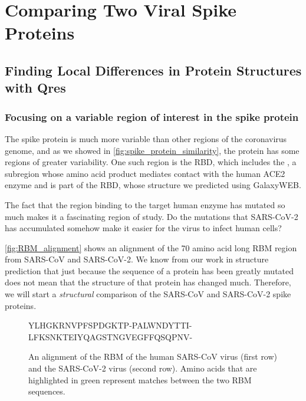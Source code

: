 \chapter[Comparing Two Viral Spike Proteins]{Comparing Two Viral Spike Proteins}
\label{chapter:coronavirus_2}
\renewcommand{\chaptertitle}{Comparing Two Viral Spike Proteins}

\FloatBarrier
{}

\section{Finding Local Differences in Protein Structures with Qres}
\label{sec:multiseq}

\FloatBarrier
{}
\subsection{Focusing on a variable region of interest in the spike protein}

The spike protein is much more variable than other regions of the coronavirus genome, and as we showed in \autoref{fig:spike_protein_similarity}, the protein has some regions of greater variability.  One such region is the RBD, which includes the , a subregion whose amino acid product mediates contact with the human ACE2 enzyme and is part of the RBD, whose structure we predicted using GalaxyWEB.

The fact that the region binding to the target human enzyme has mutated so much makes it a fascinating region of study. Do the mutations that SARS-CoV-2 has accumulated somehow make it easier for the virus to infect human cells?

\autoref{fig:RBM_alignment} shows an alignment of the 70 amino acid long RBM region from SARS-CoV and SARS-CoV-2. We know from our work in structure prediction that just because the sequence of a protein has been greatly mutated does not mean that the structure of that protein has changed much. Therefore, we will start a \textit{structural} comparison of the SARS-CoV and SARS-CoV-2 spike proteins.

\begin{figure}[h]
	\centering
	\mySfFamily
	\begin{sequence}[0.58]%
	YLHGKRNVPFSPDGKTP-PALWNDYTTI-\\
	LFKSNKTEIYQAGSTNGVEGFFQSQPNV-
	\end{sequence}
	\caption{An alignment of the RBM of the human SARS-CoV virus (first row) and the SARS-CoV-2 virus (second row). Amino acids that are highlighted in green represent matches between the two RBM sequences.}
	\label{fig:RBM_alignment}
\end{figure}


